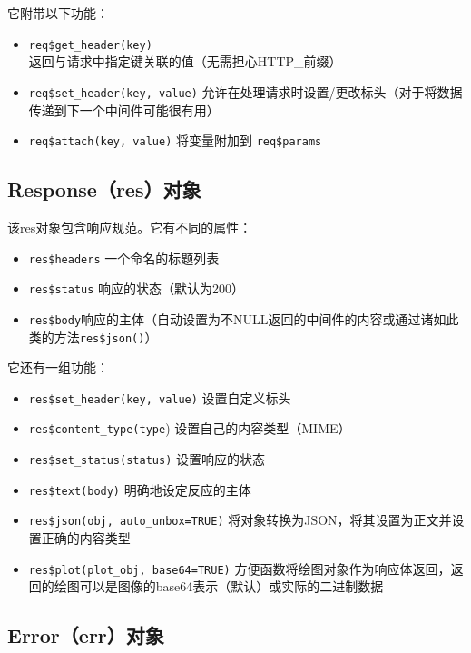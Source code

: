 \documentclass[]{book}
\providecommand{\tightlist}{%
  \setlength{\itemsep}{0pt}\setlength{\parskip}{0pt}}
\begin{document}
它附带以下功能：

\begin{itemize}
\tightlist
\item
  \texttt{req\$get\_header(key)}返回与请求中指定键关联的值（无需担心HTTP\_前缀）
\item
  \texttt{req\$set\_header(key,\ value)}
  允许在处理请求时设置/更改标头（对于将数据传递到下一个中间件可能很有用）
\item
  \texttt{req\$attach(key,\ value)} 将变量附加到 \texttt{req\$params}
\end{itemize}

\subsection{Response（res）对象}\label{responseres}

该res对象包含响应规范。它有不同的属性：

\begin{itemize}
\tightlist
\item
  \texttt{res\$headers} 一个命名的标题列表
\item
  \texttt{res\$status} 响应的状态（默认为200）
\item
  \texttt{res\$body}响应的主体（自动设置为不NULL返回的中间件的内容或通过诸如此类的方法\texttt{res\$json()}）
\end{itemize}

它还有一组功能：

\begin{itemize}
\tightlist
\item
  \texttt{res\$set\_header(key,\ value)} 设置自定义标头
\item
  \texttt{res\$content\_type(type}) 设置自己的内容类型（MIME）
\item
  \texttt{res\$set\_status(status)} 设置响应的状态
\item
  \texttt{res\$text(body)} 明确地设定反应的主体
\item
  \texttt{res\$json(obj,\ auto\_unbox=TRUE)}
  将对象转换为JSON，将其设置为正文并设置正确的内容类型
\item
  \texttt{res\$plot(plot\_obj,\ base64=TRUE)}
  方便函数将绘图对象作为响应体返回，返回的绘图可以是图像的base64表示（默认）或实际的二进制数据
\end{itemize}

\subsection{Error（err）对象}\label{errorerr}
\end{document}
